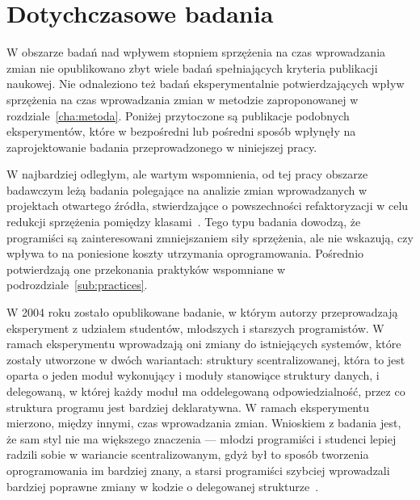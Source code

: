 
\section{Dotychczasowe badania}

W obszarze badań nad wpływem stopniem sprzężenia na czas wprowadzania zmian nie
opublikowano zbyt wiele badań spełniających kryteria publikacji naukowej.
Nie odnaleziono też badań eksperymentalnie potwierdzających wpływ sprzężenia
na czas wprowadzania zmian w metodzie zaproponowanej w rozdziale~\ref{cha:metoda}.
Poniżej przytoczone są publikacje podobnych eksperymentów,
które w bezpośredni lub pośredni sposób wpłynęły na zaprojektowanie badania
przeprowadzonego w niniejszej pracy.

W najbardziej odległym, ale wartym wspomnienia, od tej pracy obszarze badawczym
leżą badania polegające na analizie zmian wprowadzanych w projektach otwartego
źródła, stwierdzające o powszechności refaktoryzacji w celu redukcji sprzężenia
pomiędzy klasami~\cite{du2004refactoring}.
Tego typu badania dowodzą, że programiści są zainteresowani zmniejszaniem siły
sprzężenia, ale nie wskazują, czy wpływa to na poniesione koszty utrzymania
oprogramowania.
Pośrednio potwierdzają one przekonania praktyków wspomniane w
podrozdziale~\ref{sub:practices}.

W 2004 roku zostało opublikowane badanie, w którym autorzy przeprowadzają
eksperyment z udziałem studentów, młodszych i starszych programistów.
W ramach eksperymentu wprowadzają oni zmiany do istniejących systemów, które
zostały utworzone w dwóch wariantach: struktury scentralizowanej, która to
jest oparta o jeden moduł wykonujący i moduły stanowiące struktury danych, i
delegowaną, w której każdy moduł ma oddelegowaną odpowiedzialność, przez co
struktura programu jest bardziej deklaratywna.
W ramach eksperymentu mierzono, między innymi, czas wprowadzania zmian.
Wnioskiem z badania jest, że sam styl nie ma większego znaczenia --- młodzi
programiści i studenci lepiej radzili sobie w wariancie scentralizowanym, gdyż
był to sposób tworzenia oprogramowania im bardziej znany, a starsi programiści
szybciej wprowadzali bardziej poprawne zmiany w kodzie o delegowanej
strukturze~\cite{arisholm2004evaluating}.

